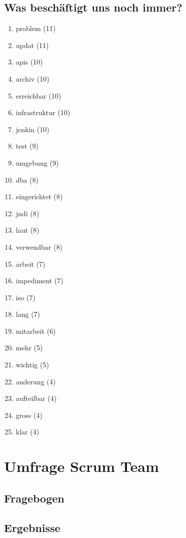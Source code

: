 \subsection*{Was beschäftigt uns noch immer?}
\begin{enumerate}
    \item problem (11)
    \item updat (11)
    \item apis (10)
    \item archiv (10)
    \item erreichbar (10)
    \item infrastruktur (10)
    \item jenkin (10)
    \item test (9)
    \item umgebung (9)
    \item dba (8)
    \item eingerichtet (8)
    \item jndi (8)
    \item laut (8)
    \item verwendbar (8)
    \item arbeit (7)
    \item impediment (7)
    \item iso (7)
    \item lang (7)
    \item mitarbeit (6)
    \item mehr (5)
    \item wichtig (5)
    \item anderung (4)
    \item aufteilbar (4)
    \item gross (4)
    \item klar (4)
\end{enumerate}

\newpage
\section{Umfrage Scrum Team}

\subsection{Fragebogen}\label{appendix:questions}


\subsection{Ergebnisse}\label{appendix:answers}


